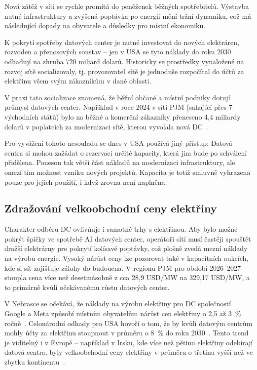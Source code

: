 Nová zátěž v síti se rychle promítá do peněženek běžných spotřebitelů. Výstavba nutné infrastruktury a zvýšená poptávka po energii mění tržní dynamiku, což má následující dopady na obyvatele a důsledky pro místní ekonomiku.

K pokrytí spotřeby datových center je nutné investovat do nových elektráren, rozvoden a přenosových soustav -- jen v USA se tyto náklady do roku 2030 odhadují na zhruba 720 miliard dolarů. Historicky se prostředky vynaložené na rozvoj sítě socializovaly, tj. provozovatel sítě je jednoduše rozpočítal do účtů za elektřinu všem svým zákazníkům v dané oblasti.~\cite[s.~18--19]{ginzburg-ganz_technical_2025}

V praxi tato socializace znamená, že běžní občané a místní podniky dotují průmysl datových center. Například v roce 2024 v síti PJM (sahající přes 7 východních států) bylo na běžné a komerční zákazníky přeneseno 4,4 miliardy dolarů v poplatcích za modernizaci sítě, kterou vyvolala nová DC~\cite[s.~19]{ginzburg-ganz_technical_2025}.

Pro vyvážení tohoto nesouladu se dnes v USA používá jiný přístup: Datová centra si mohou zažádat o rezervaci určité kapacity, která jim bude po schválení přidělena. Ponesou tak větší část nákladů na modernizaci infrastruktury, ale omezí tím možnost vzniku nových projektů. Kapacita je totiž smluvně vyhrazena pouze pro jejich použití, i když zrovna není naplněna.~\cite[s.~106--107]{international_energy_agency_iea_energy_2025}

\subsection{Zdražování velkoobchodní ceny elektřiny}
\label{subsec:energie_zdrazovani}

Charakter odběru DC ovlivňuje i samotné trhy s elektřinou. Aby bylo možné pokrýt špičky ve spotřebě AI datových center, operátoři sítí musí častěji spouštět dražší elektrárny pro pokrytí kolísavé poptávky, což plošně zvedá mezní náklady na výrobu energie. Vysoký nárůst ceny lze pozorovat také v kapacitních aukcích, kde si síť zajišťuje zálohy do budoucna. V regionu PJM pro období 2026--2027 stoupla cena více než desetinásobně z cca 28,9 USD/MW na 329,17 USD/MW, a to primárně kvůli očekávanému růstu datových center.~\cite[s.~9]{chen_electricity_2025}

V Nebrasce se očekává, že náklady na výrobu elektřiny pro DC společností Google a Meta způsobí místním obyvatelům nárůst cen elektřiny o 2,5 až 3~\% ročně~\cite[s.~23]{de_roucy-rochegonde_ai_2025}. Celonárodní odhady pro USA hovoří o tom, že by kvůli datovým centrům mohly účty za elektřinu stoupnout v průměru o 8~\% do roku 2030~\cite[s.~19]{ginzburg-ganz_technical_2025}. Tento trend je viditelný i v Evropě -- například v Irsku, kde více než pětinu elektřiny odebírají datová centra, byly velkoobchodní ceny elektřiny v průměru o třetinu vyšší než ve zbytku kontinentu~\cite[s.~23]{de_roucy-rochegonde_ai_2025}.

